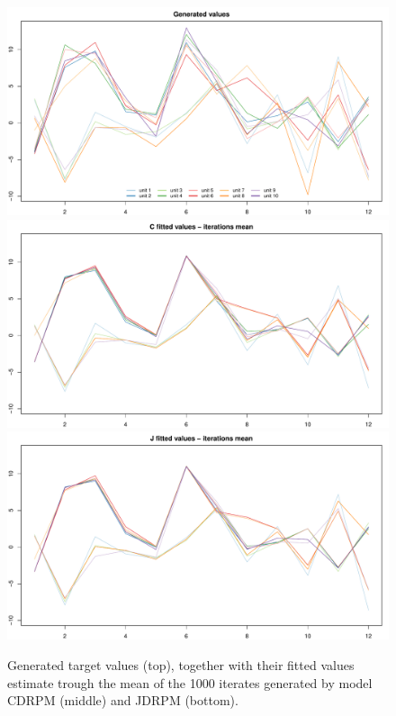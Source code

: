 \documentclass[12pt,	%
	a4paper,		%
	twoside,		%
	openright,		%
	titlepage,%
	]{book}
\theoremstyle{definition}
\begin{document}
\begin{figure}[!p]
    \centering
    \includegraphics[width=0.97\linewidth]{Testing//Assessing correctness//no space/test_1_generated_data.pdf}
    \includegraphics[width=0.97\linewidth]{Testing//Assessing correctness//no space/C_mean_prediction.pdf}
    \includegraphics[width=0.97\linewidth]{Testing//Assessing correctness//no space/J_mean_prediction.pdf}
    \caption[Generated and fitted values of JDRPM and CDRPM fits, target values only]{Generated target values (top), together with their fitted values estimate trough the mean of the 1000 iterates generated by model CDRPM (middle) and JDRPM (bottom).}
    \label{fig: fitted and target values no space}
\end{figure}
\end{document}
